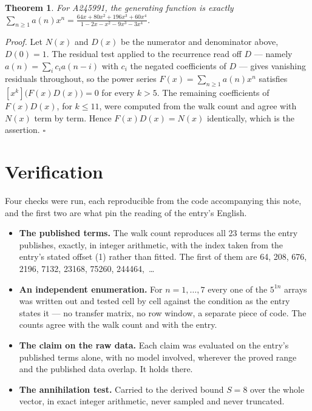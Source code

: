 \documentclass[11pt]{article}
\newtheorem{theorem}{Theorem}
\theoremstyle{definition}
\begin{document}
\begin{theorem} For A245991, the generating function is exactly $\sum_{n\ge 1} a(n)x^n = \frac{64x + 80x^{2} + 196x^{3} + 60x^{4}}{1 - 2x - x^{2} - 9x^{3} - 3x^{4}}$.\end{theorem}

{\itshape Proof.} Let $N(x)$ and $D(x)$ be the numerator and denominator above, $D(0)=1$. The residual test applied to the recurrence read off $D$ --- namely $a(n) = \sum_i c_i a(n-i)$ with $c_i$ the negated coefficients of $D$ --- gives vanishing residuals throughout, so the power series $F(x)=\sum_{n\ge 1}a(n)x^n$ satisfies $[x^k]\bigl(F(x)D(x)\bigr) = 0$ for every $k > 5$. The remaining coefficients of $F(x)D(x)$, for $k \le 11$, were computed from the walk count and agree with $N(x)$ term by term. Hence $F(x)D(x) = N(x)$ identically, which is the assertion. $\square$

\section{Verification}

Four checks were run, each reproducible from the code accompanying this note, and the first two are what pin the reading of the entry's English.

\begin{itemize}

\item {\bfseries The published terms.} The walk count reproduces all 23 terms the entry publishes, exactly, in integer arithmetic, with the index taken from the entry's stated offset (1) rather than fitted. The first of them are 64, 208, 676, 2196, 7132, 23168, 75260, 244464,~\dots

\item {\bfseries An independent enumeration.} For $n = 1,\dots,7$ every one of the $5^{1n}$ arrays was written out and tested cell by cell against the condition as the entry states it --- no transfer matrix, no row window, a separate piece of code. The counts agree with the walk count and with the entry.

\item {\bfseries The claim on the raw data.} Each claim was evaluated on the entry's published terms alone, with no model involved, wherever the proved range and the published data overlap. It holds there.

\item {\bfseries The annihilation test.} Carried to the derived bound $S = 8$ over the whole vector, in exact integer arithmetic, never sampled and never truncated.

\end{itemize}
\end{document}

